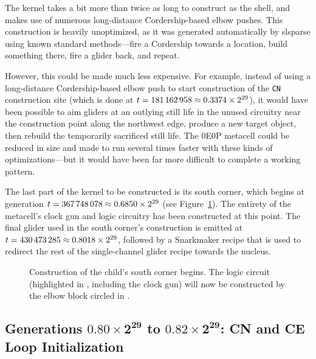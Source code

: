 The kernel takes a bit more than twice as long to construct as the shell, and makes use of numerous long-distance Cordership-based elbow pushes. This construction is heavily unoptimized, as it was generated automatically by slsparse using known standard methods---fire a Cordership towards a location, build something there, fire a glider back, and repeat.

However, this could be made much less expensive. For example, instead of using a long-distance Cordership-based elbow push to start construction of the \texttt{CN} construction site (which is done at $t = 181{\,}162{\,}958 \approx 0.3374 \times 2^{29}$), it would have been possible to aim gliders at an outlying still life in the unused circuitry near the construction point along the northwest edge, produce a new target object, then rebuild the temporarily sacrificed still life. The 0E0P metacell could be reduced in size and made to run several times faster with these kinds of optimizations---but it would have been far more difficult to complete a working pattern.

The last part of the kernel to be constructed is its south corner, which begins at generation $t = 367{\,}748{\,}078 \approx 0.6850 \times 2^{29}$ (see Figure~\ref{fig:0e0p_timeline_367748078}). The entirety of the metacell's clock gun and logic circuitry has been constructed at this point. The final glider used in the south corner's construction is emitted at $t = 430{\,}473{\,}285 \approx 0.8018 \times 2^{29}$, followed by a Snarkmaker recipe that is used to redirect the rest of the single-channel glider recipe towards the nucleus.

\begin{figure}[!htb]
	\centering
	\caption{Construction of the child's south corner begins. The logic circuit (highlighted in , including the clock gun) will now be constructed by the elbow block circled in .}
	\label{fig:0e0p_timeline_367748078}
\end{figure}


\subsection{Generations $\mathbf{0.80 \times 2^{29}}$ to $\mathbf{0.82 \times 2^{29}}$: CN and CE Loop Initialization}\label{sec:0e0p_timeline_nucleus_nw}

